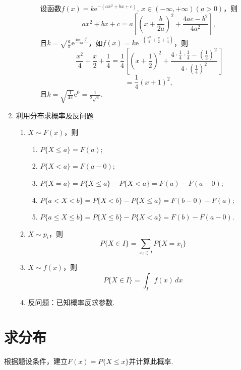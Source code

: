 \begin{enumerate}
\begin{enumerate}
\begin{note}{}{}
\begin{enumerate}
                                          设函数$f(x)=k\mathrm{e}^{-(ax^2+bx+c)}$, $x\in(-\infty,+\infty)(a>0)$，则
                                          $$
                                                ax^2+bx+c=a\left[\left(x+\frac{b}{2a}\right)^2+\frac{4ac-b^2}{4a^2}\right],$$
                                          且$k=\sqrt{\frac{a}{\pi}}\mathrm{e}^{\frac{4ac-b^2}{4a}}$，如$f(x)=k\mathrm{e}^{-\left(\frac{x^2}{4}+\frac{x}{2}+\frac{1}{4}\right)}$，则
                                          $$\frac{x^2}{4}+\frac{x}{2}+\frac{1}{4}=\frac{1}{4}\left[\left(x+\frac{1}{2}\right)^2+\frac{4\cdot\frac{1}{4}\cdot\frac{1}{4}-\left(\frac{1}{2}\right)^2}{4\cdot\left(\frac{1}{4}\right)^2}\right]$$
                                          $$
                                                =\frac{1}{4}(x+1)^2,$$
                                          且$k=\sqrt{\frac{1}{4\pi}}\mathrm{e}^0=\frac{1}{2\sqrt{\pi}}$.
                              \end{enumerate}
                        \end{note}
            \end{enumerate}
      \item 利用分布求概率及反问题
            \begin{enumerate}
                  \item  $X \sim F(x)$，则
                        \begin{enumerate}
                              \item  $P\{X \leqslant a\} = F(a)$;
                              \item  $P\{X < a\} = F(a-0)$;
                              \item  $P\{X = a\} = P\{X \leqslant a\} - P\{X < a\} = F(a) - F(a-0)$;
                              \item  $P\{a < X < b\} = P\{X < b\} - P\{X \leqslant a\} = F(b-0) - F(a)$;
                              \item  $P\{a \leqslant X \leqslant b\} = P\{X \leqslant b\} - P\{X < a\} = F(b) - F(a-0)$.
                        \end{enumerate}
                  \item $X \sim p_{i}$，则
                        $$P\{X \in I\} = \sum_{x_{i} \in I} P\{X = x_{i}\}$$
                  \item $X \sim f(x)$，则
                        $$P\{X \in I\} = \int_{I} f(x) \, dx$$
                  \item 反问题：已知概率反求参数.
            \end{enumerate}
\end{enumerate}

\section{求分布}
\DOne

根据题设条件，建立$F(x) = P\{X\leq x\}$并计算此概率.